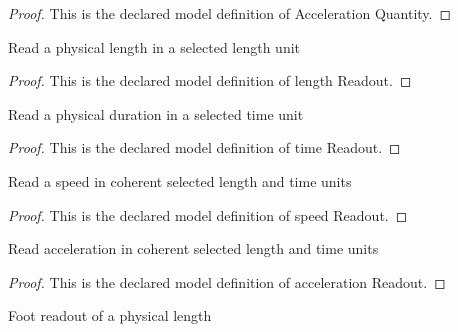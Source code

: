 \begin{proof}
  This is the declared model definition of Acceleration Quantity.
\end{proof}
\begin{definition}
  \label{def:physics:phyx-mini-0751:phyxminiproblems-problemphyxmini0751-lengthreadout}
  Read a physical length in a selected length unit
\end{definition}
\begin{proof}
  This is the declared model definition of length Readout.
\end{proof}
\begin{definition}
  \label{def:physics:phyx-mini-0751:phyxminiproblems-problemphyxmini0751-timereadout}
  Read a physical duration in a selected time unit
\end{definition}
\begin{proof}
  This is the declared model definition of time Readout.
\end{proof}
\begin{definition}
  \label{def:physics:phyx-mini-0751:phyxminiproblems-problemphyxmini0751-speedreadout}
  Read a speed in coherent selected length and time units
\end{definition}
\begin{proof}
  This is the declared model definition of speed Readout.
\end{proof}
\begin{definition}
  \label{def:physics:phyx-mini-0751:phyxminiproblems-problemphyxmini0751-accelerationreadout}
  Read acceleration in coherent selected length and time units
\end{definition}
\begin{proof}
  This is the declared model definition of acceleration Readout.
\end{proof}
\begin{definition}
  \label{def:physics:phyx-mini-0751:phyxminiproblems-problemphyxmini0751-lengthinfeet}
  Foot readout of a physical length
\end{definition}
